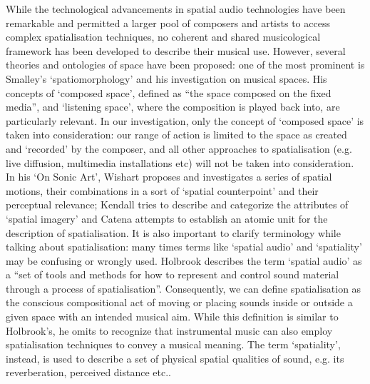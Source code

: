 \documentclass{article}
\begin{document}
While the technological advancements in spatial audio technologies have been remarkable and permitted a larger pool of composers and artists to access complex spatialisation techniques, no coherent and shared musicological framework has been developed to describe their musical use\cite{Kendall2007}. However, several theories and ontologies of space have been proposed: one of the most prominent is Smalley’s ‘spatiomorphology’\cite{Smalley1997} and his investigation on musical spaces\cite{Smalley2007}. His concepts of ‘composed space’, defined as “the space composed on the fixed media”, and ‘listening space’, where the composition is played back into, are particularly relevant. In our investigation, only the concept of ‘composed space’ is taken into consideration: our range of action is limited to the space as created and ‘recorded’ by the composer, and all other approaches to spatialisation (e.g. live diffusion, multimedia installations etc) will not be taken into consideration.
In his ‘On Sonic Art’, Wishart proposes and investigates a series of spatial motions, their combinations in a sort of ‘spatial counterpoint’ and their perceptual relevance\cite{Wishart1996}; Kendall tries to describe and categorize the attributes of ‘spatial imagery’\cite{Kendall2010} and Catena attempts to establish an atomic unit for the description of spatialisation\cite{Catena2022}.
It is also important to clarify terminology while talking about spatialisation: many times terms like ‘spatial audio’ and ‘spatiality’ may be confusing or wrongly used. Holbrook describes the term ‘spatial audio’ as a “set of tools and methods for how to represent and control sound material through a process of spatialisation”\cite{Holbrook2019}. Consequently, we can define spatialisation as the conscious compositional act of moving or placing sounds inside or outside a given space with an intended musical aim. While this definition is similar to Holbrook’s, he omits to recognize that instrumental music can also employ spatialisation techniques to convey a musical meaning. The term ‘spatiality’, instead, is used to describe a set of physical spatial qualities of sound, e.g. its reverberation, perceived distance etc..
\end{document}
